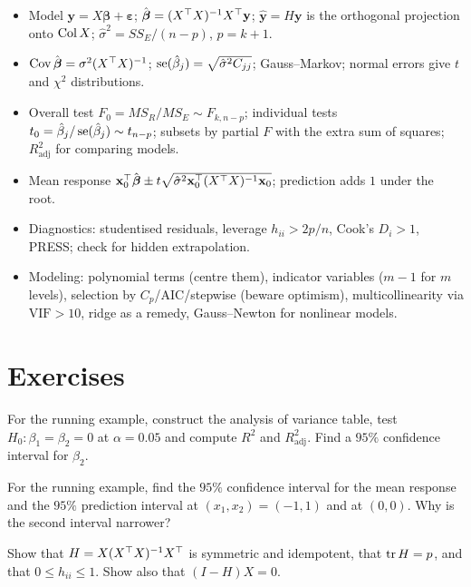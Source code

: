 \begin{summarybox}
\begin{itemize}
  \item Model $\mathbf{y}=X\boldsymbol\beta+\boldsymbol\varepsilon$; $\hat{\boldsymbol\beta}=(X^{\top} X)^{-1}X^{\top}\mathbf{y}$; $\hat{\mathbf{y}}=H\mathbf{y}$ is the orthogonal projection onto $\operatorname{Col} X$; $\hat\sigma^2=SS_E/(n-p)$, $p=k+1$.
  \item $\operatorname{Cov}\hat{\boldsymbol\beta}=\sigma^2(X^{\top} X)^{-1}$; $\operatorname{se}(\hat\beta_j)=\sqrt{\hat\sigma^2C_{jj}}$; Gauss--Markov; normal errors give $t$ and $\chi^2$ distributions.
  \item Overall test $F_0=MS_R/MS_E\sim F_{k,n-p}$; individual tests $t_0=\hat\beta_j/\operatorname{se}(\hat\beta_j)\sim t_{n-p}$; subsets by partial $F$ with the extra sum of squares; $R^2_{\mathrm{adj}}$ for comparing models.
  \item Mean response $\mathbf{x}_0^{\top}\hat{\boldsymbol\beta}\pm t\sqrt{\hat\sigma^2\mathbf{x}_0^{\top}(X^{\top} X)^{-1}\mathbf{x}_0}$; prediction adds $1$ under the root.
  \item Diagnostics: studentised residuals, leverage $h_{ii}>2p/n$, Cook's $D_i>1$, PRESS; check for hidden extrapolation.
  \item Modeling: polynomial terms (centre them), indicator variables ($m-1$ for $m$ levels), selection by $C_p$/AIC/stepwise (beware optimism), multicollinearity via $\mathrm{VIF}>10$, ridge as a remedy, Gauss--Newton for nonlinear models.
\end{itemize}
\end{summarybox}

\section{Exercises}

\begin{exercise}
For the running example, construct the analysis of variance table, test $H_0:\beta_1=\beta_2=0$ at $\alpha=0.05$ and compute $R^2$ and $R^2_{\mathrm{adj}}$. Find a $95\%$ confidence interval for $\beta_2$.
\end{exercise}

\begin{exercise}
For the running example, find the $95\%$ confidence interval for the mean response and the $95\%$ prediction interval at $(x_1,x_2)=(-1,1)$ and at $(0,0)$. Why is the second interval narrower?
\end{exercise}

\begin{exercise}
Show that $H=X(X^{\top} X)^{-1}X^{\top}$ is symmetric and idempotent, that $\operatorname{tr} H=p$, and that $0\le h_{ii}\le1$. Show also that $(I-H)X=0$.
\end{exercise}

